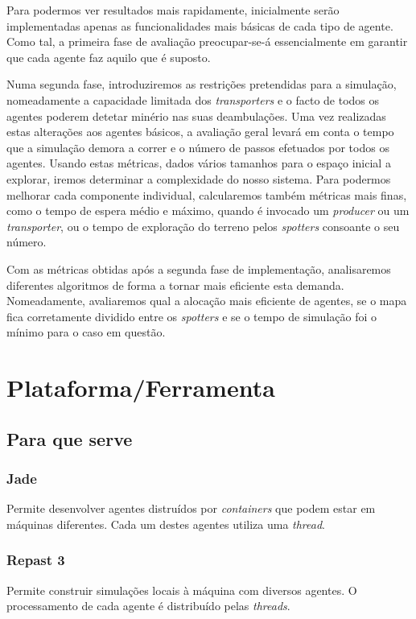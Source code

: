 \documentclass[12pt]{report}
\begin{document}
Para podermos ver resultados mais rapidamente, inicialmente serão implementadas apenas as funcionalidades mais básicas de cada tipo de agente. Como tal, a primeira fase de avaliação preocupar-se-á essencialmente em garantir que cada agente faz aquilo que é suposto.

Numa segunda fase, introduziremos as restrições pretendidas para a simulação, nomeadamente a capacidade limitada dos \emph{transporters} e o facto de todos os agentes poderem detetar minério nas suas deambulações. Uma vez realizadas estas alterações aos agentes básicos, a avaliação geral levará em conta o tempo que a simulação demora a correr e o número de passos efetuados por todos os agentes. Usando estas métricas, dados vários tamanhos para o espaço inicial a explorar, iremos determinar a complexidade do nosso sistema. Para podermos melhorar cada componente individual, calcularemos também métricas mais finas, como o tempo de espera médio e máximo, quando é invocado um \emph{producer} ou um \emph{transporter}, ou o tempo de exploração do terreno pelos \emph{spotters} consoante o seu número.

Com as métricas obtidas após a segunda fase de implementação, analisaremos diferentes algoritmos de forma a tornar mais eficiente esta demanda. Nomeadamente, avaliaremos qual a alocação mais eficiente de agentes, se o mapa fica corretamente dividido entre os \emph{spotters} e se o tempo de simulação foi o mínimo para o caso em questão.

 
\chapter{Plataforma/Ferramenta}

\section{Para que serve}

  \subsection{Jade}
  Permite desenvolver agentes distruídos por \emph{containers} que podem estar em máquinas diferentes. Cada um destes agentes utiliza uma \emph{thread}. 

  \subsection{Repast 3}
  Permite construir simulações locais à máquina com diversos agentes. O processamento de cada agente é distribuído pelas \emph{threads}.
\end{document}

